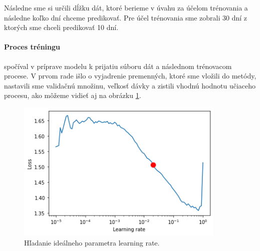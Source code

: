 Následne sme si určili dĺžku dát, ktoré berieme v úvahu za účelom trénovania a následne koľko dní chceme predikovať. Pre účel trénovania sme zobrali 30 dní z ktorých sme chceli predikovať 10 dní.

\paragraph{Proces tréningu} spočíval v príprave modelu k prijatiu súboru dát a následnom trénovacom procese. V prvom rade išlo o vyjadrenie premenných, ktoré sme vložili do metódy, nastavili sme validačnú množinu, veľkosť dávky a zistili vhodnú hodnotu učiaceho procesu, ako môžeme vidieť aj na obrázku \ref{lr-tune}. 

\begin{figure}[!htbp]
  \centering
  \includegraphics[width=10cm]{img/n-beats-lr.png}
  \caption{Hľadanie ideálneho parametra learning rate.}
  \label{lr-tune}
\end{figure}

